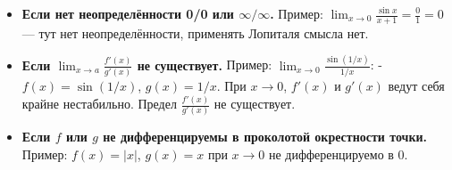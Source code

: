 \medskip


\begin{itemize}
  \item \textbf{Если нет неопределённости 0/0 или $\infty/\infty$.}  
    Пример: $\lim_{x\to 0}\frac{\sin x}{x+1}=\frac{0}{1}=0$ — тут нет неопределённости, применять Лопиталя смысла нет.
  \item \textbf{Если $\lim_{x\to a}\frac{f'(x)}{g'(x)}$ не существует.}  
    Пример: $\lim_{x\to 0}\frac{\sin(1/x)}{1/x}$:  
    - $f(x)=\sin(1/x)$, $g(x)=1/x$. При $x\to0$, $f'(x)$ и $g'(x)$ ведут себя крайне нестабильно. Предел $\frac{f'(x)}{g'(x)}$ не существует.  
  \item \textbf{Если $f$ или $g$ не дифференцируемы в проколотой окрестности точки.}  
    Пример: $f(x)=|x|$, $g(x)=x$ при $x\to 0$ не дифференцируемо в $0$.  
\end{itemize}

\medskip

